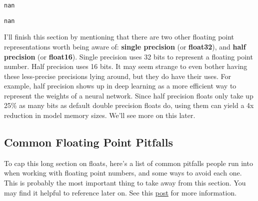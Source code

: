 \documentclass[
  letterpaper,
  DIV=11,
  numbers=noendperiod]{scrreprt}
\begin{document}
\begin{verbatim}
nan
\end{verbatim}

\begin{verbatim}
nan
\end{verbatim}

I'll finish this section by mentioning that there are two other floating
point representations worth being aware of: \textbf{single precision}
(or \textbf{float32}), and \textbf{half precision} (or
\textbf{float16}). Single precision uses 32 bits to represent a floating
point number. Half precision uses 16 bits. It may seem strange to even
bother having these less-precise precisions lying around, but they do
have their uses. For example, half precision shows up in deep learning
as a more efficient way to represent the weights of a neural network.
Since half precision floats only take up 25\% as many bits as default
double precision floats do, using them can yield a 4x reduction in model
memory sizes. We'll see more on this later.

\hypertarget{common-floating-point-pitfalls}{%
\subsection{Common Floating Point
Pitfalls}\label{common-floating-point-pitfalls}}

To cap this long section on floats, here's a list of common pitfalls
people run into when working with floating point numbers, and some ways
to avoid each one. This is probably the most important thing to take
away from this section. You may find it helpful to reference later on.
See this
\href{https://www.codeproject.com/Articles/29637/Five-Tips-for-Floating-Point-Programming}{post}
for more information.
\end{document}
